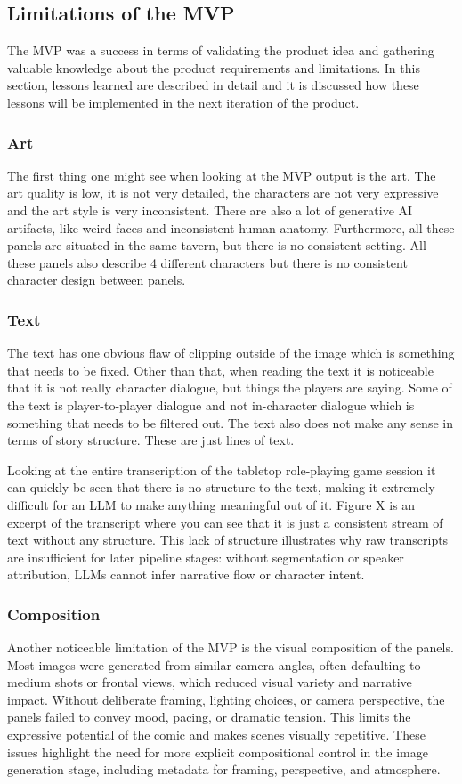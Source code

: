 \subsection{Limitations of the MVP}
The MVP was a success in terms of validating the product idea and gathering valuable knowledge about the product requirements and limitations. In this section, lessons learned are described in detail and it is discussed how these lessons will be implemented in the next iteration of the product.

\subsubsection{Art}
The first thing one might see when looking at the MVP output is the art. The art quality is low, it is not very detailed, the characters are not very expressive and the art style is very inconsistent. There are also a lot of generative AI artifacts, like weird faces and inconsistent human anatomy. Furthermore, all these panels are situated in the same tavern, but there is no consistent setting. All these panels also describe 4 different characters but there is no consistent character design between panels.

\subsubsection{Text}
The text has one obvious flaw of clipping outside of the image which is something that needs to be fixed. Other than that, when reading the text it is noticeable that it is not really character dialogue, but things the players are saying. Some of the text is player-to-player dialogue and not in-character dialogue which is something that needs to be filtered out. The text also does not make any sense in terms of story structure. These are just lines of text.

Looking at the entire transcription of the tabletop role-playing game session it can quickly be seen that there is no structure to the text, making it extremely difficult for an LLM to make anything meaningful out of it. Figure X is an excerpt of the transcript where you can see that it is just a consistent stream of text without any structure. This lack of structure illustrates why raw transcripts are insufficient for later pipeline stages: without segmentation or speaker attribution, LLMs cannot infer narrative flow or character intent.

\subsubsection{Composition}
Another noticeable limitation of the MVP is the visual composition of the panels. Most images were generated from similar camera angles, often defaulting to medium shots or frontal views, which reduced visual variety and narrative impact. Without deliberate framing, lighting choices, or camera perspective, the panels failed to convey mood, pacing, or dramatic tension. This limits the expressive potential of the comic and makes scenes visually repetitive. These issues highlight the need for more explicit compositional control in the image generation stage, including metadata for framing, perspective, and atmosphere.

